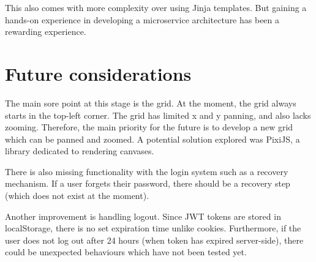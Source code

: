 This also comes with more complexity over using Jinja templates.
But gaining a hands-on experience in developing a microservice architecture has been a rewarding experience.

\section{Future considerations}\label{sec:additional-features-and-future-considerations}
The main sore point at this stage is the grid.
At the moment, the grid always starts in the top-left corner.
The grid has limited x and y panning, and also lacks zooming.
Therefore, the main priority for the future is to develop a new grid which can be panned and zoomed.
A potential solution explored was PixiJS, a library dedicated to rendering canvases.

There is also missing functionality with the login system such as a recovery mechanism.
If a user forgets their password, there should be a recovery step (which does not exist at the moment).

Another improvement is handling logout.
Since JWT tokens are stored in localStorage, there is no set expiration time unlike cookies.
Furthermore, if the user does not log out after 24 hours (when token has expired server-side), there could be unexpected behaviours which have not been tested yet.